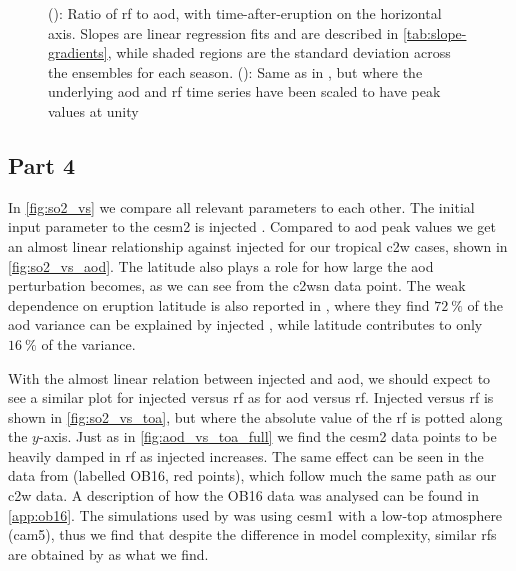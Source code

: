 \documentclass{ametsocV5}
\newcommand{\iso}[1][i]{{#1}njected \ce{SO2}}
\begin{document}
\begin{figure}
  \caption{(): Ratio of \ac{rf} to \ac{aod}, with
    time-after-eruption on the horizontal axis. Slopes are linear regression fits and are
    described in \cref{tab:slope-gradients}, while shaded regions are the standard deviation
    across the ensembles for each season. ():
    Same as in , but where the underlying \ac{aod} and
    \ac{rf} time series have been scaled to have peak values at
    unity}\label{fig:aod_vs_toa_avg_loop_ratios}%
\end{figure}

\subsection{Part 4}

In \cref{fig:so2_vs} we compare all relevant parameters to each other. The initial input
parameter to the \ac{cesm2} is injected . Compared to \ac{aod} peak values we
get an almost linear relationship against \iso{} for our tropical \ac{c2w} cases, shown
in \cref{fig:so2_vs_aod}. The latitude also plays a role for how large the \ac{aod}
perturbation becomes, as we can see from the \ac{c2wsn} data point. The weak dependence
on eruption latitude is also reported in \citet{marshall2019}, where they find
\(\SI{72}{\percent}\) of the \ac{aod} variance can be explained by \iso{}, while
latitude contributes to only \(\SI{16}{\percent}\) of the variance.

With the almost linear relation between injected  and \ac{aod}, we should expect
to see a similar plot for \iso{} versus \ac{rf} as for \ac{aod} versus \ac{rf}. \iso[I]
versus \ac{rf} is shown in \cref{fig:so2_vs_toa}, but where the absolute value of the
\ac{rf} is potted along the \(y\)-axis. Just as in \cref{fig:aod_vs_toa_full} we find
the \ac{cesm2} data points to be heavily damped in \ac{rf} as \iso{} increases. The same
effect can be seen in the data from \citet{ottobliesner2016} (labelled OB16, red
points), which follow much the same path as our \ac{c2w} data. A description of how the
OB16 data was analysed can be found in \cref{app:ob16}. The simulations used by
\citet{ottobliesner2016} was using \ac{cesm1} with a low-top atmosphere (\ac{cam5}),
thus we find that despite the difference in model complexity, similar \acp{rf} are
obtained by \citet{ottobliesner2016} as what we find.
\end{document}
